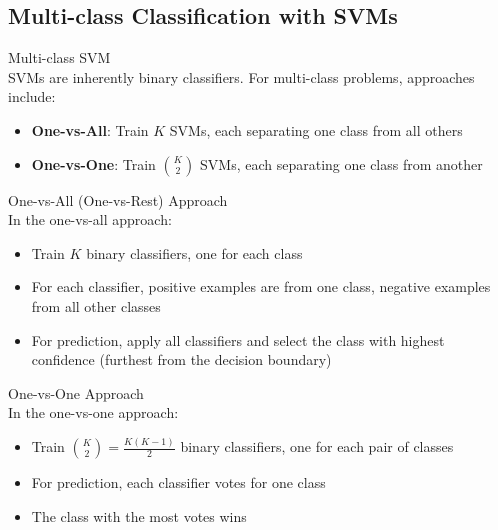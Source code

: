 \subsection{Multi-class Classification with SVMs}

\begin{concept}{Multi-class SVM}\\
SVMs are inherently binary classifiers. For multi-class problems, approaches include:
\begin{itemize}
    \item \textbf{One-vs-All}: Train $K$ SVMs, each separating one class from all others
    \item \textbf{One-vs-One}: Train $\binom{K}{2}$ SVMs, each separating one class from another
\end{itemize}
\end{concept}

\begin{definition}{One-vs-All (One-vs-Rest) Approach}\\
In the one-vs-all approach:
\begin{itemize}
    \item Train $K$ binary classifiers, one for each class
    \item For each classifier, positive examples are from one class, negative examples from all other classes
    \item For prediction, apply all classifiers and select the class with highest confidence (furthest from the decision boundary)
\end{itemize}
\end{definition}

\begin{definition}{One-vs-One Approach}\\
In the one-vs-one approach:
\begin{itemize}
    \item Train $\binom{K}{2} = \frac{K(K-1)}{2}$ binary classifiers, one for each pair of classes
    \item For prediction, each classifier votes for one class
    \item The class with the most votes wins
\end{itemize}
\end{definition}

